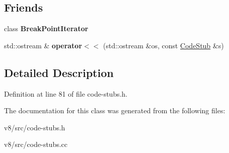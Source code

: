 \subsection*{Friends}
\begin{DoxyCompactItemize}
\item 
\mbox{\label{classv8_1_1internal_1_1CodeStub_a096b3a9009a783c1025b73df216fa85f}} 
class {\bfseries Break\+Point\+Iterator}
\item 
\mbox{\label{classv8_1_1internal_1_1CodeStub_a339c419cc6fc0e8026ac8dc8fa59a98c}} 
std\+::ostream \& {\bfseries operator$<$$<$} (std\+::ostream \&os, const \mbox{\hyperlink{classv8_1_1internal_1_1CodeStub}{Code\+Stub}} \&s)
\end{DoxyCompactItemize}


\subsection{Detailed Description}


Definition at line 81 of file code-\/stubs.\+h.



The documentation for this class was generated from the following files\+:\begin{DoxyCompactItemize}
\item 
v8/src/code-\/stubs.\+h\item 
v8/src/code-\/stubs.\+cc\end{DoxyCompactItemize}
